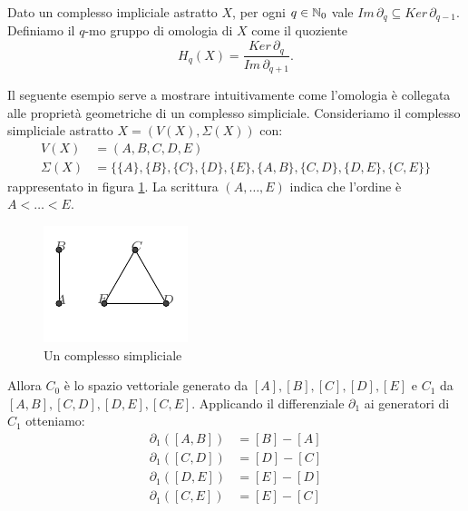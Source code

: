 \begin{defn}
  Dato un complesso impliciale astratto $X$, per ogni $q\in\mathbb{N}_0$ vale $Im\,\partial_q \subseteq Ker\,\partial_{q-1}$. Definiamo il $q$-mo gruppo di omologia di $X$ come il quoziente
  \begin{equation*}
    H_q(X) = \frac{Ker\,\partial_q}{Im\,\partial_{q+1}}.
  \end{equation*}
\end{defn}

Il seguente esempio serve a mostrare intuitivamente come l'omologia è collegata alle proprietà geometriche di un complesso simpliciale. Consideriamo il complesso simpliciale astratto $X=(V(X),\Sigma(X))$ con:
\begin{align*}
  V(X) &= ( A,B,C,D,E )\\
  \Sigma(X) &= \{ \{A\}, \{B\}, \{C\}, \{D\}, \{E\}, \{A,B\}, \{C,D\}, \{D,E\}, \{C,E\} \}
\end{align*}
rappresentato in figura \cref{fig:simplicialcomplex}. La scrittura $(A,\dots,E)$ indica che l'ordine è $A<\dots<E$.

\begin{figure}[h]
  \includegraphics[width=.7\linewidth]{gfx/example_homology.pdf}
  \caption{Un complesso simpliciale}
  \label{fig:simplicialcomplex}
\end{figure}

Allora $C_0$ è lo spazio vettoriale generato da $[A], [B], [C], [D], [E]$ e $C_1$ da $[A,B], [C,D], [D,E], [C,E]$.
Applicando il differenziale $\partial_1$ ai generatori di $C_1$ otteniamo:
\begin{align*}
  \partial_1([A,B]) &= [B] - [A]\\
  \partial_1([C,D]) &= [D] - [C]\\
  \partial_1([D,E]) &= [E] - [D]\\
  \partial_1([C,E]) &= [E] - [C]
\end{align*}

